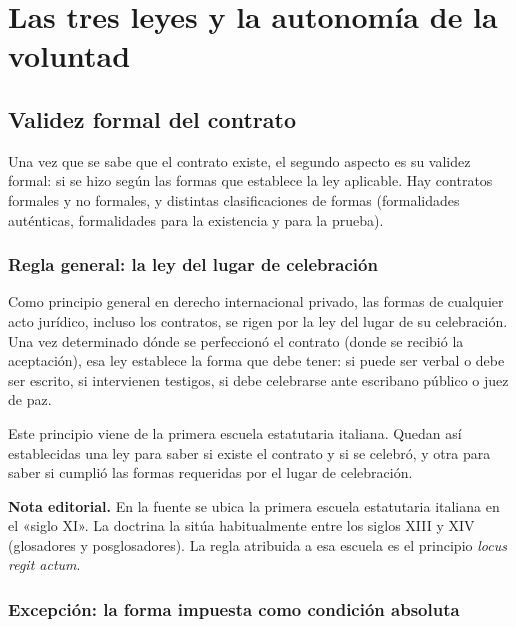 \documentclass[12pt,oneside]{book}
\begin{document}
\chapter[Tres leyes y autonomía de la voluntad]{Las tres leyes y la autonomía de la voluntad}

\section{Validez formal del contrato}

Una vez que se sabe que el contrato existe, el segundo aspecto es su validez formal: si se hizo según las formas que establece la ley aplicable. Hay contratos formales y no formales, y distintas clasificaciones de formas (formalidades auténticas, formalidades para la existencia y para la prueba).

\subsection{Regla general: la ley del lugar de celebración}

Como principio general en derecho internacional privado, las formas de cualquier acto jurídico, incluso los contratos, se rigen por la ley del lugar de su celebración. Una vez determinado dónde se perfeccionó el contrato (donde se recibió la aceptación), esa ley establece la forma que debe tener: si puede ser verbal o debe ser escrito, si intervienen testigos, si debe celebrarse ante escribano público o juez de paz.

Este principio viene de la primera escuela estatutaria italiana. Quedan así establecidas una ley para saber si existe el contrato y si se celebró, y otra para saber si cumplió las formas requeridas por el lugar de celebración.

\begin{note}
\textbf{Nota editorial.} En la fuente se ubica la primera escuela estatutaria italiana en el «siglo XI». La doctrina la sitúa habitualmente entre los siglos XIII y XIV (glosadores y posglosadores). La regla atribuida a esa escuela es el principio \textit{locus regit actum}.
\end{note}

\subsection{Excepción: la forma impuesta como condición absoluta}
\end{document}
